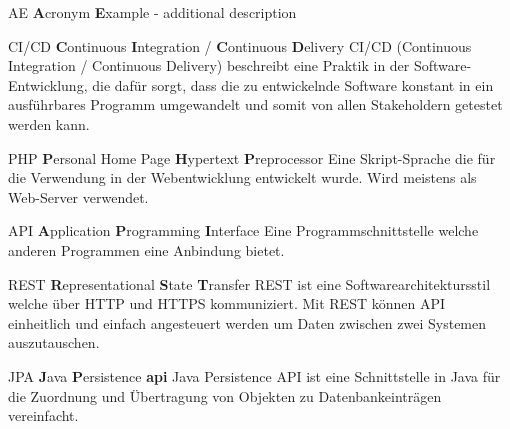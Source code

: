 %
%


\usepackage{xparse}

 {
	\makeglossaries
}





{AE}
{\textbf{A}cronym \textbf{E}xample - additional description}





	{CI/CD}
	{\textbf{C}ontinuous \textbf{I}ntegration / \textbf{C}ontinuous \textbf{D}elivery}
	{
			CI/CD (Continuous Integration / Continuous Delivery) beschreibt eine Praktik in der Software-Entwicklung, die dafür sorgt, dass die zu entwickelnde Software konstant in ein ausführbares Programm umgewandelt und somit von allen Stakeholdern getestet werden kann.\cite{CI/CD}
	}

	{PHP}
	{\textbf{P}ersonal Home Page \textbf{H}ypertext \textbf{P}reprocessor}
	{
		Eine Skript-Sprache die für die Verwendung in der Webentwicklung entwickelt wurde. Wird meistens als Web-Server verwendet.\cite{PHP}
	}

	{API}
	{\textbf{A}pplication \textbf{P}rogramming \textbf{I}nterface}
	{
		Eine Programmschnittstelle welche anderen Programmen eine Anbindung bietet.\cite{API}
	}

	{REST}
	{\textbf{R}epresentational \textbf{S}tate \textbf{T}ransfer}
	{
		REST ist eine Softwarearchitektursstil welche über HTTP und HTTPS kommuniziert. Mit REST können API einheitlich und einfach angesteuert werden um Daten zwischen zwei Systemen auszutauschen.\cite{REST}
	}

	{JPA}
	{\textbf{J}ava \textbf{P}ersistence \textbf{\gls{api}}}
	{
		Java Persistence API ist eine Schnittstelle in Java für die Zuordnung und Übertragung von Objekten zu Datenbankeinträgen vereinfacht.\cite{JPA}
	}

